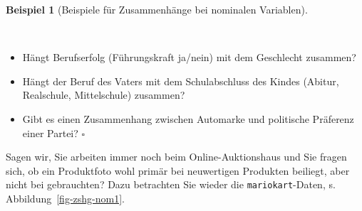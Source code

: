\documentclass[
  a4paper,
  DIV=11]{scrreprt}
\providecommand{\tightlist}{%
  \setlength{\itemsep}{0pt}\setlength{\parskip}{0pt}}\usepackage{longtable,booktabs,array}
\theoremstyle{definition}
\theoremstyle{definition}
\newtheorem{example}{Beispiel}[chapter]
\theoremstyle{definition}
\theoremstyle{remark}
\begin{document}
\begin{example}[Beispiele für Zusammenhänge bei nominalen
Variablen]\protect\hypertarget{exm-nom-zshg}{}\label{exm-nom-zshg}

~

\begin{itemize}
\tightlist
\item
  Hängt Berufserfolg (Führungskraft ja/nein) mit dem Geschlecht
  zusammen?
\item
  Hängt der Beruf des Vaters mit dem Schulabschluss des Kindes (Abitur,
  Realschule, Mittelschule) zusammen?
\item
  Gibt es einen Zusammenhang zwischen Automarke und politische Präferenz
  einer Partei? \(\square\)
\end{itemize}

\end{example}

Sagen wir, Sie arbeiten immer noch beim Online-Auktionshaus und Sie
fragen sich, ob ein Produktfoto wohl primär bei neuwertigen Produkten
beiliegt, aber nicht bei gebrauchten? Dazu betrachten Sie wieder die
\texttt{mariokart}-Daten, s. Abbildung~\ref{fig-zshg-nom1}.
\end{document}
